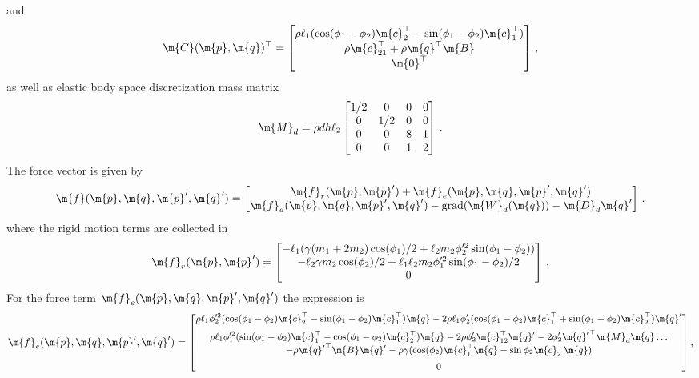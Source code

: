 %
and
%
\begin{equation*}
  \m{C}(\m{p}, \m{q})^\top = \begin{bmatrix}
    \rho \ell_1(\cos(\phi_1 - \phi_2)\m{c}_2^\top - \sin(\phi_1 - \phi_2)\m{c}_1^\top) \\
    \rho\m{c}_{21}^\top + \rho\m{q}^\top\m{B} \\
    \m{0}^\top
  \end{bmatrix} \, \text{,}
\end{equation*}
%
as well as elastic body space discretization mass matrix
%
\begin{equation*}
  \m{M}_{d} = \rho d h \ell_2 \begin{bmatrix}
    1/2 & 0   & 0 & 0 \\
    0   & 1/2 & 0 & 0 \\
    0   & 0   & 8 & 1 \\
    0   & 0   & 1 & 2
  \end{bmatrix} \, \text{.}
\end{equation*}
%
The force vector is given by
%
\begin{equation}
  \m{f}(\m{p}, \m{q}, \m{p}^\prime, \m{q}^\prime) = \begin{bmatrix}
    \m{f}_r(\m{p}, \m{p}^\prime) + \m{f}_e(\m{p}, \m{q}, \m{p}^\prime, \m{q}^\prime) \\
    \m{f}_{d}(\m{p}, \m{q}, \m{p}^\prime, \m{q}^\prime) - \mathrm{grad}(\m{W}_{d}(\m{q})) - \m{D}_{d} \m{q}^\prime
  \end{bmatrix} \, \text{.}
\end{equation}
%
where the rigid motion terms are collected in
%
\begin{equation*}
  \m{f}_r(\m{p}, \m{p}^\prime) = \begin{bmatrix}
    -\ell_1(\gamma(m_1 + 2m_2) \cos(\phi_1)/2 + \ell_2 m_2 \phi_2^{\prime2} \sin(\phi_1 - \phi_2)) \\
    -\ell_2 \gamma m_2 \cos(\phi_2)/2 + \ell_1 \ell_2 m_2 \phi_1^{\prime2} \sin(\phi_1 - \phi_2)/2 \\
    0
  \end{bmatrix} \, \text{.}
\end{equation*}
%
For the force term $\m{f}_e(\m{p}, \m{q}, \m{p}^\prime, \m{q}^\prime)$ the expression is
%
\begin{equation*}
  \m{f}_e(\m{p}, \m{q}, \m{p}^\prime, \m{q}^\prime) = \small{\begin{bmatrix}
    \rho \ell_1 \phi_2^{\prime2}(\cos(\phi_1 - \phi_2)\m{c}_2^\top - \sin(\phi_1 - \phi_2)\m{c}_1^\top) \m{q}-2 \rho \ell_1 \phi_2^\prime(\cos(\phi_1 - \phi_2)\m{c}_1^\top + \sin(\phi_1 - \phi_2)\m{c}_2^\top) \m{q}^\prime \\[0.5em]
    \rho \ell_1 \phi_1^{\prime2}(\sin(\phi_1 - \phi_2)\m{c}_1^\top - \cos(\phi_1 - \phi_2)\m{c}_2^\top) \m{q}-2 \rho \phi_2^\prime \m{c}_{12}^\top \m{q}^\prime-2 \phi_2^\prime {\m{q}^\prime}^\top \m{M}_{d} \m{q} \dots\\
    -\rho {\m{q}^\prime}^\top \m{B} \m{q}^\prime - \rho \gamma(\cos(\phi_2) \m{c}_1^\top \m{q} - \sin \phi_2 \m{c}_2^\top \m{q}) \\[0.5em]
    0
\end{bmatrix}} \, \text{,}
\end{equation*}
